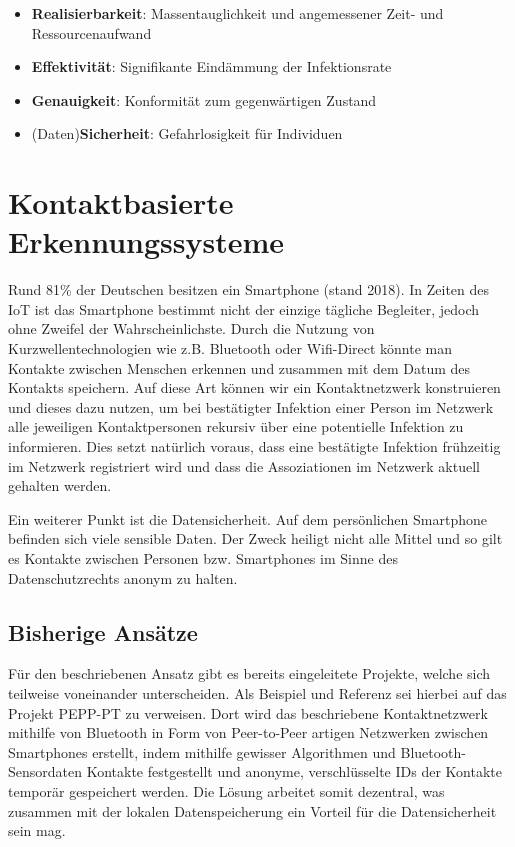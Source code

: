 \documentclass[12pt]{article}
\begin{document}
\begin{itemize}
	\item \textbf{Realisierbarkeit}:  Massentauglichkeit und angemessener Zeit- und Ressourcenaufwand
	\item \textbf{Effektivität}: Signifikante Eindämmung der Infektionsrate
	\item \textbf{Genauigkeit}: Konformität zum gegenwärtigen Zustand
	\item (Daten)\textbf{Sicherheit}: Gefahrlosigkeit für Individuen
\end{itemize}


\section{Kontaktbasierte Erkennungssysteme}

Rund 81\% der Deutschen besitzen ein Smartphone (stand 2018). In Zeiten des IoT
ist das Smartphone bestimmt nicht der einzige tägliche Begleiter, jedoch ohne Zweifel der Wahrscheinlichste. Durch die Nutzung von Kurzwellentechnologien wie z.B. Bluetooth oder Wifi-Direct könnte man Kontakte zwischen Menschen erkennen und zusammen mit dem Datum des Kontakts speichern. Auf diese Art können wir ein Kontaktnetzwerk konstruieren und dieses dazu nutzen, um bei bestätigter Infektion einer Person im Netzwerk alle jeweiligen Kontaktpersonen rekursiv über eine potentielle Infektion zu informieren. Dies setzt
natürlich voraus, dass eine bestätigte Infektion frühzeitig im Netzwerk registriert wird und dass die Assoziationen im Netzwerk aktuell gehalten werden.

Ein weiterer Punkt ist die Datensicherheit. Auf dem persönlichen Smartphone befinden sich viele sensible Daten. Der Zweck heiligt nicht alle Mittel und so gilt es Kontakte zwischen Personen bzw. Smartphones im Sinne des Datenschutzrechts anonym zu halten.

\subsection{Bisherige Ansätze}
Für den beschriebenen Ansatz gibt es bereits eingeleitete Projekte, welche sich teilweise voneinander unterscheiden. Als Beispiel und Referenz sei hierbei auf das Projekt PEPP-PT zu verweisen. Dort wird das beschriebene Kontaktnetzwerk mithilfe von Bluetooth in Form von Peer-to-Peer artigen Netzwerken zwischen Smartphones erstellt, indem mithilfe gewisser Algorithmen und Bluetooth-Sensordaten Kontakte festgestellt und anonyme, verschlüsselte IDs der
Kontakte temporär gespeichert werden. Die Lösung arbeitet somit dezentral, was zusammen mit der lokalen Datenspeicherung ein Vorteil für die Datensicherheit sein mag.
\end{document}
